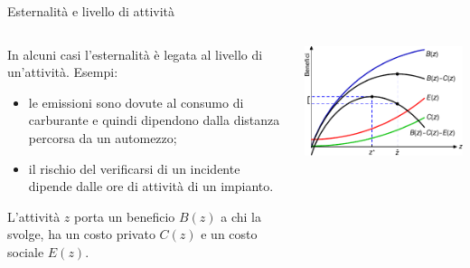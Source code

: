 \documentclass[aspectratio=64,11pt]{beamer}
\begin{document}
\begin{frame}{Esternalità e livello di attività}
\begin{columns}
\begin{column}{.5\columnwidth}
In alcuni casi l’esternalità è legata al livello di un'attività. Esempi:
\begin{itemize}
\item le emissioni sono dovute al consumo di carburante e quindi dipendono dalla distanza percorsa da un automezzo;
\item il rischio del verificarsi di un incidente dipende dalle ore di attività di un impianto.
\end{itemize}
L’attività $z$ porta un beneficio $B(z)$ a chi la svolge, ha un costo privato $C(z)$ e un costo sociale $E(z)$.
\end{column}
\begin{column}{.5\columnwidth}
\begin{center}
\includegraphics[width=\textwidth]{./figure/esternalita-1-color.pdf}
\end{center}
\end{column}
\end{columns}
\end{frame}
\end{document}
